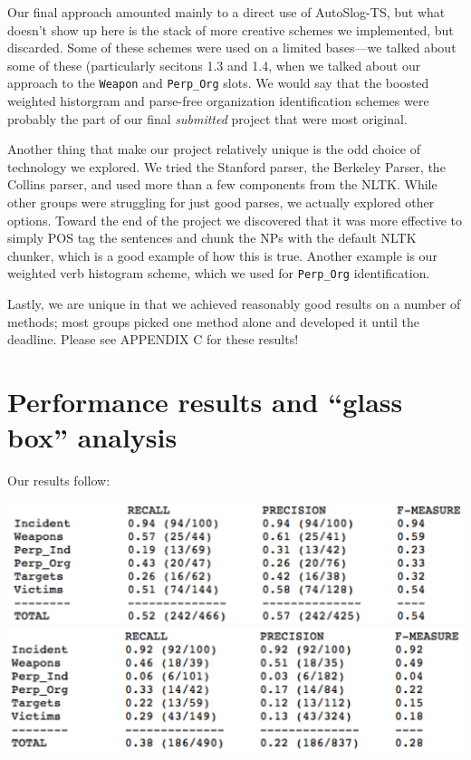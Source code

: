 \documentclass[11pt]{myclass}
\begin{document}
Our final approach amounted mainly to a direct use of AutoSlog-TS, but what doesn't show up here is the stack of more creative schemes we implemented, but discarded. Some of these schemes were used on a limited bases---we talked about some of these (particularly secitons 1.3 and 1.4, when we talked about our approach to the \texttt{Weapon} and \texttt{Perp\_Org} slots. We would say that the boosted weighted historgram and parse-free organization identification schemes were probably the part of our final \textit{submitted} project that were most original.

Another thing that make our project relatively unique is the odd choice of technology we explored. We tried the Stanford parser, the Berkeley Parser, the Collins parser, and used more than a few components from the NLTK. While other groups were struggling for just good parses, we actually explored other options. Toward the end of the project we discovered that it was more effective to simply POS tag the sentences and chunk the NPs with the default NLTK chunker, which is a good example of how this is true. Another example is our weighted verb histogram scheme, which we used for \texttt{Perp\_Org} identification.

Lastly, we are unique in that we achieved reasonably good results on a number of methods; most groups picked one method alone and developed it until the deadline. Please see APPENDIX C for these results!

\section{Performance results and “glass box” analysis}

Our results follow:

\includegraphics[scale=0.75]{result_t1.png} \\
\includegraphics[scale=0.75]{result_t2.png} \\
\end{document}
